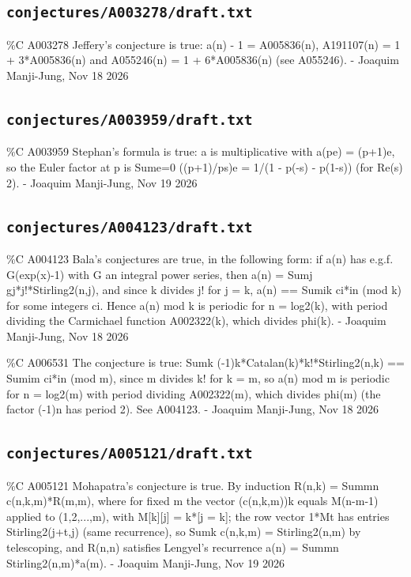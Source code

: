 \subsection*{\texttt{conjectures/A003278/draft.txt}}
{\small\raggedright\ttfamily
\%C A003278 Jeffery's conjecture is true: a(n) - 1 = A005836(n), A191107(n) = 1 + 3*A005836(n) and A055246(n) = 1 + 6*A005836(n) (see A055246). - Joaquim Manji-Jung, Nov 18 2026\par
}
\subsection*{\texttt{conjectures/A003959/draft.txt}}
{\small\raggedright\ttfamily
\%C A003959 Stephan's formula is true: a is multiplicative with a(pe) = (p+1)e, so the Euler factor at p is Sume=0 ((p+1)/ps)e = 1/(1 - p(-s) - p(1-s)) (for Re(s)  2). - Joaquim Manji-Jung, Nov 19 2026\par
}
\subsection*{\texttt{conjectures/A004123/draft.txt}}
{\small\raggedright\ttfamily
\%C A004123 Bala's conjectures are true, in the following form: if a(n) has e.g.f. G(exp(x)-1) with G an integral power series, then a(n) = Sumj gj*j!*Stirling2(n,j), and since k divides j! for j = k, a(n) == Sumik ci*in (mod k) for some integers ci. Hence a(n) mod k is periodic for n = log2(k), with period dividing the Carmichael function A002322(k), which divides phi(k). - Joaquim Manji-Jung, Nov 18 2026\par
\%C A006531 The conjecture is true: Sumk (-1)k*Catalan(k)*k!*Stirling2(n,k) == Sumim ci*in (mod m), since m divides k! for k = m, so a(n) mod m is periodic for n = log2(m) with period dividing A002322(m), which divides phi(m) (the factor (-1)n has period 2). See A004123. - Joaquim Manji-Jung, Nov 18 2026\par
}
\subsection*{\texttt{conjectures/A005121/draft.txt}}
{\small\raggedright\ttfamily
\%C A005121 Mohapatra's conjecture is true. By induction R(n,k) = Summn c(n,k,m)*R(m,m), where for fixed m the vector (c(n,k,m))k equals M(n-m-1) applied to (1,2,...,m), with M[k][j] = k*[j = k]; the row vector 1*Mt has entries Stirling2(j+t,j) (same recurrence), so Sumk c(n,k,m) = Stirling2(n,m) by telescoping, and R(n,n) satisfies Lengyel's recurrence a(n) = Summn Stirling2(n,m)*a(m). - Joaquim Manji-Jung, Nov 19 2026\par
}
